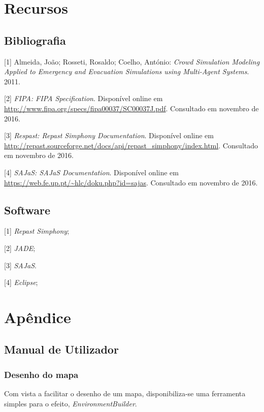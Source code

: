 \documentclass[12pt]{article}
\begin{document}
\begin{titlepage}
\section{Recursos}
\subsection{Bibliografia}
[1] Almeida, João; Rosseti, Rosaldo; Coelho, António: \textit{Crowd Simulation Modeling Applied to Emergency and Evacuation Simulations using Multi-Agent Systems}. 2011.

[2] \textit{FIPA: FIPA Specification}. Disponível online em \url{http://www.fipa.org/specs/fipa00037/SC00037J.pdf}. Consultado em novembro de 2016.

[3] \textit{Respast: Repast Simphony Documentation}. Disponível online em \url{http://repast.sourceforge.net/docs/api/repast_simphony/index.html}. Consultado em novembro de 2016.

[4] \textit{SAJaS: SAJaS Documentation}. Disponível online em \url{https://web.fe.up.pt/~hlc/doku.php?id=sajas}. Consultado em novembro de 2016.


\subsection{Software}
[1] \textit{Repast Simphony};

[2] \textit{JADE};

[3] \textit{SAJaS}.

[4] \textit{Eclipse};

\newpage

\section{Apêndice}


\subsection{Manual de Utilizador}

\subsubsection{Desenho do mapa}

Com vista a facilitar o desenho de um mapa, disponibiliza-se uma ferramenta simples para o efeito, \textit{EnvironmentBuilder}.


\end{titlepage}
\end{document}
